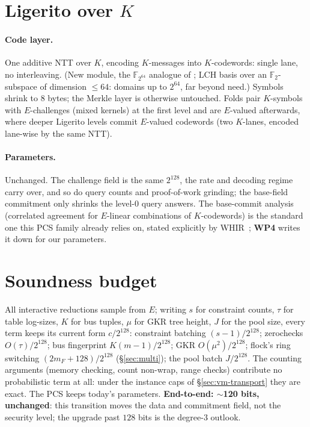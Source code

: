\documentclass[11pt]{article}
\newcommand{\F}{\mathbb{F}}
\newcommand{\K}{K}            %
\newcommand{\E}{E}            %
\newcommand{\WP}[1]{\textbf{WP#1}}
\begin{document}
\section{Ligerito over $\K$}\label{sec:pcs}

\paragraph{Code layer.} One additive NTT over $\K$, encoding
$\K$-messages into $\K$-codewords: single lane, no interleaving. (New
module, the $\F_{2^{64}}$ analogue of ;
LCH basis over an $\F_2$-subspace of dimension $\le 64$: domains up to
$2^{64}$, far beyond need.) Symbols shrink to $8$ bytes; the Merkle layer is otherwise
untouched. Folds pair $\K$-symbols with $\E$-challenges (mixed kernels)
at the first level and are $\E$-valued afterwards, where deeper Ligerito
levels commit $\E$-valued codewords (two $\K$-lanes, encoded lane-wise by
the same NTT).

\paragraph{Parameters.} Unchanged. The challenge field is the same
$2^{128}$, the rate and decoding regime carry over, and so do query counts
and proof-of-work grinding; the base-field commitment only shrinks the
level-0 query answers. The base-commit analysis (correlated agreement for
$\E$-linear combinations of $\K$-codewords) is the standard one this PCS
family already relies on, stated explicitly by WHIR~\cite{whir}; \WP4
writes it down for our parameters.

\section{Soundness budget}\label{sec:soundness}

All interactive reductions sample from $\E$; writing $s$ for constraint
counts, $\tau$ for table log-sizes, $K$ for bus tuples, $\mu$ for GKR tree
height, $J$ for the pool size, every term keeps its current form
$c/2^{128}$: constraint batching $(s-1)/2^{128}$; zerochecks
$O(\tau)/2^{128}$; bus fingerprint $K(m-1)/2^{128}$; GKR
$O(\mu^2)/2^{128}$; flock's ring switching $(2m_F+128)/2^{128}$
(\S\ref{sec:multi}); the pool batch $J/2^{128}$. The counting arguments
(memory checking, count non-wrap, range checks) contribute no
probabilistic term at all: under the instance caps of
\S\ref{sec:vm-transport} they are exact. The PCS keeps today's
parameters. \textbf{End-to-end: $\sim$120 bits, unchanged}: this
transition moves the data and commitment field, not the security level;
the upgrade past $128$ bits is the degree-3 outlook.
\end{document}
